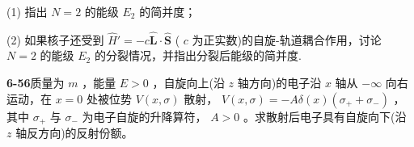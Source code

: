 (1) 指出 $\displaystyle N = 2$ 的能级 $\displaystyle E_{2}$ 的简并度；

(2) 如果核子还受到 $\displaystyle \hat{H}' = -c\hat{\pmb{L}} \cdot \hat{\pmb{S}}$ ( $\displaystyle c$ 为正实数)的自旋-轨道耦合作用，讨论 $\displaystyle N = 2$ 的能级 $\displaystyle E_{2}$ 的分裂情况，并指出分裂后能级的简并度.

\vfill

\newpage

\textbf{6-56}\quad 质量为 $\displaystyle m$ ，能量 $\displaystyle E > 0$ ，自旋向上(沿 $\displaystyle z$ 轴方向)的电子沿 $\displaystyle x$ 轴从 $\displaystyle -\infty$ 向右运动，在 $\displaystyle x = 0$ 处被位势 $\displaystyle V(x, \sigma)$ 散射， $\displaystyle V(x, \sigma) = -A\delta(x)(\sigma_{+} + \sigma_{-})$ ，其中 $\displaystyle \sigma_{+}$ 与 $\displaystyle \sigma_{-}$ 为电子自旋的升降算符， $\displaystyle A > 0$ 。求散射后电子具有自旋向下(沿 $\displaystyle z$ 轴反方向)的反射份额。

\vfill

\newpage

